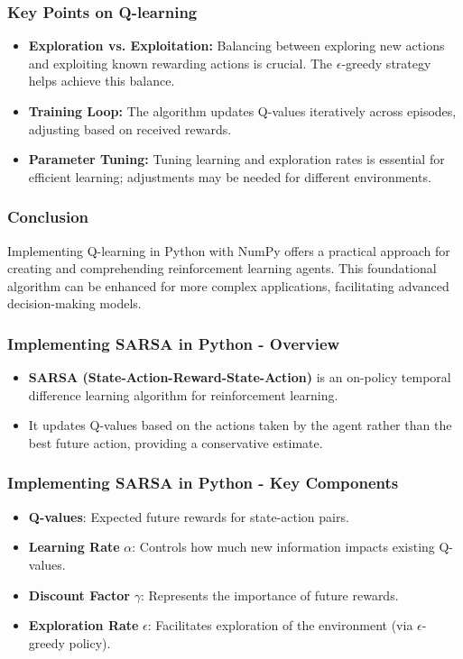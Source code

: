 \documentclass[aspectratio=169]{beamer}
\begin{document}
\begin{frame}
    \frametitle{Key Points on Q-learning}
    \begin{itemize}
        \item \textbf{Exploration vs. Exploitation:} Balancing between exploring new actions and exploiting known rewarding actions is crucial. The $\epsilon$-greedy strategy helps achieve this balance.
        \item \textbf{Training Loop:} The algorithm updates Q-values iteratively across episodes, adjusting based on received rewards.
        \item \textbf{Parameter Tuning:} Tuning learning and exploration rates is essential for efficient learning; adjustments may be needed for different environments.
    \end{itemize}
\end{frame}

\begin{frame}
    \frametitle{Conclusion}
    Implementing Q-learning in Python with NumPy offers a practical approach for creating and comprehending reinforcement learning agents. This foundational algorithm can be enhanced for more complex applications, facilitating advanced decision-making models.
\end{frame}

\begin{frame}
    \frametitle{Implementing SARSA in Python - Overview}
    \begin{itemize}
        \item \textbf{SARSA (State-Action-Reward-State-Action)} is an on-policy temporal difference learning algorithm for reinforcement learning.
        \item It updates Q-values based on the actions taken by the agent rather than the best future action, providing a conservative estimate.
    \end{itemize}
\end{frame}

\begin{frame}
    \frametitle{Implementing SARSA in Python - Key Components}
    \begin{itemize}
        \item \textbf{Q-values}: Expected future rewards for state-action pairs.
        \item \textbf{Learning Rate} $\alpha$: Controls how much new information impacts existing Q-values.
        \item \textbf{Discount Factor} $\gamma$: Represents the importance of future rewards.
        \item \textbf{Exploration Rate} $\epsilon$: Facilitates exploration of the environment (via $\epsilon$-greedy policy).
    \end{itemize}
\end{frame}
\end{document}
